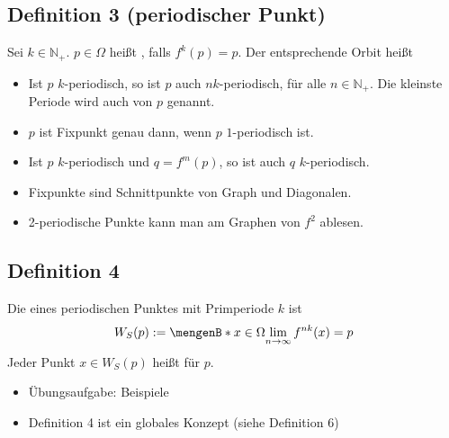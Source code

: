 \subsection{Definition 3 (periodischer Punkt)} %
\label{sub:definition_3}
Sei $k \in \mathds{N}_+$. $p \in \Omega$ heißt , falls $f^k(p)=p$. Der entsprechende Orbit heißt 
\begin{itemize}
	\item Ist $p$ $k$-periodisch, so ist $p$ auch $nk$-periodisch, für alle $n \in \mathds{N}_+$. Die kleinste Periode wird auch  von $p$ genannt.
	\item $p$ ist Fixpunkt genau dann, wenn $p$ $1$-periodisch ist.
	\item Ist $p$ $k$-periodisch und $q=f^m(p)$, so ist auch $q$ $k$-periodisch.
\end{itemize}
\begin{itemize}
	\item Fixpunkte sind Schnittpunkte von Graph und Diagonalen.
	\item 2-periodische Punkte kann man am Graphen von $f^2$ ablesen.
\end{itemize}

\subsection{Definition 4} %
\label{sub:definition_4}
Die  eines periodischen Punktes mit Primperiode $k$ ist
\[
	W_S(p) := \set[x \in \Omega]{\lim_{n \to \infty} f^{nk}(x)=p} 
\]
Jeder Punkt $x \in W_S(p)$ heißt  für $p$.
\begin{itemize}
	\item Übungsaufgabe: Beispiele
	\item Definition 4 ist ein globales Konzept (siehe Definition 6)
\end{itemize} 

